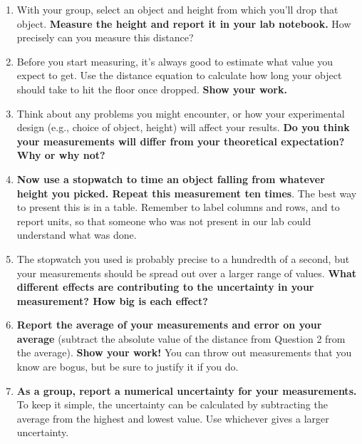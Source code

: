 \documentclass[12pt]{article}%
\begin{document}
\begin{enumerate}

\item With your group, select an object and height from which you'll drop that object. \textbf{Measure the height and report it in your lab notebook.} How precisely can you measure this distance?

\item Before you start measuring, it's always good to estimate what value you expect to get. Use the distance equation to calculate how long your object should take to hit the floor once dropped. \textbf{Show your work.}

\item Think about any problems you might encounter, or how your experimental design (e.g., choice of object, height) will affect your results. \textbf{Do you think your measurements will differ from your theoretical expectation? Why or why not?}

\item {\bf Now use a stopwatch to time an object falling from whatever height you picked. Repeat this measurement ten times}. The best way to present this is in a table. Remember to label columns and rows, and to report units, so that someone who was not present in our lab could understand what was done.

\item The stopwatch you used is probably precise to a hundredth of a second, but your measurements should be spread out over a larger range of values. \textbf{What different effects are contributing to the uncertainty in your measurement? How big is each effect?}

\item \textbf{Report the average of your measurements and error on your average} (subtract the absolute value of the distance from Question 2 from the average). \textbf{Show your work!} You can throw out measurements that you know are bogus, but be sure to justify it if you do. 
\item \textbf{As a group, report a numerical uncertainty for your measurements.} To keep it simple, the uncertainty can be calculated by subtracting the average from the highest and lowest value. Use whichever gives a larger uncertainty.


\end{enumerate}
\end{document}
